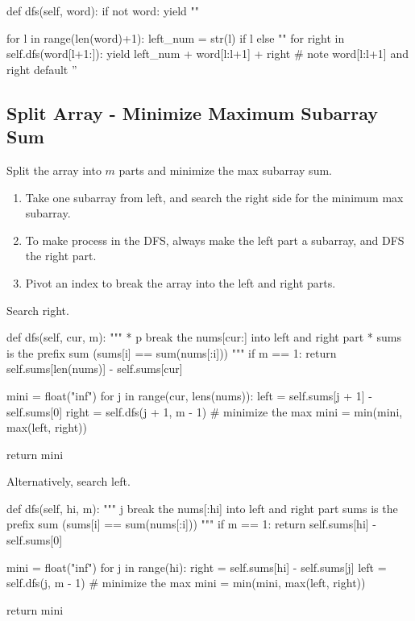 \begin{python}
def dfs(self, word):
    if not word:
        yield ""

    for l in range(len(word)+1):
        left_num = str(l) if l else ""
        for right in self.dfs(word[l+1:]):
            yield left_num + word[l:l+1] + right
            # note word[l:l+1] and right default ''
\end{python}

\subsection{Split Array - Minimize Maximum Subarray Sum}
Split the array into $m$ parts and minimize the max subarray sum.
\begin{enumerate}
\item Take one subarray from left, and search the right side for the minimum max subarray. 
\item To make process in the DFS, always make the left part a subarray, and DFS the right part. 
\item Pivot an index to break the array into the left and right parts.
\end{enumerate}

Search right.
\begin{python}
def dfs(self, cur, m):
    """
    * p break the nums[cur:] into left and right part
    * sums is the prefix sum (sums[i] == sum(nums[:i]))
    """
    if m == 1:
        return self.sums[len(nums)] - self.sums[cur]

    mini = float("inf")
    for j in range(cur, lens(nums)):
        left = self.sums[j + 1] - self.sums[0]
        right = self.dfs(j + 1, m - 1)
        # minimize the max
        mini = min(mini, max(left, right))

    return mini
\end{python}

Alternatively, search left. 
\begin{python}
def dfs(self, hi, m):
    """
    j break the nums[:hi] into left and right part
    sums is the prefix sum (sums[i] == sum(nums[:i]))
    """
    if m == 1:
        return self.sums[hi] - self.sums[0]

    mini = float("inf")
    for j in range(hi):
        right = self.sums[hi] - self.sums[j]
        left = self.dfs(j, m - 1)
        # minimize the max
        mini = min(mini, max(left, right))

    return mini
\end{python}


